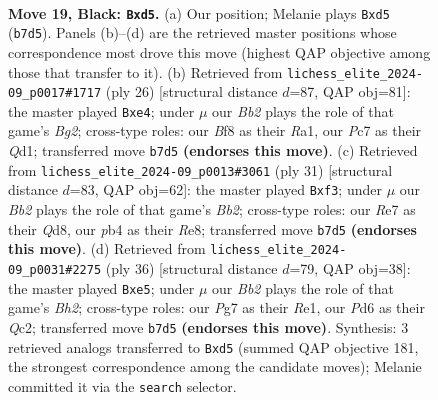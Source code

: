 \documentclass[11pt]{article}
\begin{document}
\clearpage

\begin{figure}[p]\centering
\begin{subfigure}{0.46\textwidth}\centering
\resizebox{\linewidth}{!}{%
\newchessgame
\chessboard[
  setfen={1r1q1b2/nbp1rppk/p2p4/1p1Bp2p/1PP1P3/P2P1N1P/3BRPP1/RQ3K2 b - - 0 19},
  showmover=false,
  pgfstyle=straightmove, color=movearrow, markmove={b7-d5}
]}
\caption{}
\end{subfigure}\hfill
\begin{subfigure}{0.46\textwidth}\centering
\resizebox{\linewidth}{!}{%
\newchessgame
\chessboard[
  setfen={r4rk1/pp1q1pp1/2pbp2p/3p4/2PPb3/1P4P1/PB2PPBP/R2QR1K1 w - - 0 14},
  showmover=false,
  pgfstyle=straightmove, color=movearrow, markmove={g2-e4}
]}
\caption{}
\end{subfigure}
\\[4pt]
\begin{subfigure}{0.46\textwidth}\centering
\resizebox{\linewidth}{!}{%
\newchessgame
\chessboard[
  setfen={1r1qr1k1/1bpn1pbp/1p1p2p1/pN2p3/P2P4/2P1PB1P/1P3PPB/R2Q1RK1 b - - 3 16},
  showmover=false,
  pgfstyle=straightmove, color=movearrow, markmove={b7-f3}
]}
\caption{}
\end{subfigure}\hfill
\begin{subfigure}{0.46\textwidth}\centering
\resizebox{\linewidth}{!}{%
\newchessgame
\chessboard[
  setfen={2b1rrk1/ppq1pp1p/3p2p1/2pPb2n/P1B1P3/2P4P/1PQN1PPB/R3R1K1 w - - 0 19},
  showmover=false,
  pgfstyle=straightmove, color=movearrow, markmove={h2-e5}
]}
\caption{}
\end{subfigure}
\caption{\textbf{Move 19, Black: \texttt{Bxd5}.} (a) Our position; Melanie plays \texttt{Bxd5} (\texttt{b7d5}). Panels (b)--(d) are the retrieved master positions whose correspondence most drove this move (highest QAP objective among those that transfer to it). (b) Retrieved from \texttt{lichess\_elite\_2024-09\_p0017\#1717} (ply 26) [structural distance $d$=87, QAP obj=81]: the master played \texttt{Bxe4}; under $\mu$ our \emph{Bb2} plays the role of that game's \emph{Bg2}; cross-type roles: our \emph{B}f8 as their \emph{R}a1, our \emph{P}c7 as their \emph{Q}d1; transferred move \texttt{b7d5} \textbf{(endorses this move)}. (c) Retrieved from \texttt{lichess\_elite\_2024-09\_p0013\#3061} (ply 31) [structural distance $d$=83, QAP obj=62]: the master played \texttt{Bxf3}; under $\mu$ our \emph{Bb2} plays the role of that game's \emph{Bb2}; cross-type roles: our \emph{R}e7 as their \emph{Q}d8, our \emph{p}b4 as their \emph{R}e8; transferred move \texttt{b7d5} \textbf{(endorses this move)}. (d) Retrieved from \texttt{lichess\_elite\_2024-09\_p0031\#2275} (ply 36) [structural distance $d$=79, QAP obj=38]: the master played \texttt{Bxe5}; under $\mu$ our \emph{Bb2} plays the role of that game's \emph{Bh2}; cross-type roles: our \emph{P}g7 as their \emph{R}e1, our \emph{P}d6 as their \emph{Q}c2; transferred move \texttt{b7d5} \textbf{(endorses this move)}. Synthesis: 3 retrieved analogs transferred to \texttt{Bxd5} (summed QAP objective 181, the strongest correspondence among the candidate moves); Melanie committed it via the \texttt{search} selector.}
\label{fig:thought-m37}
\end{figure}
\end{document}
